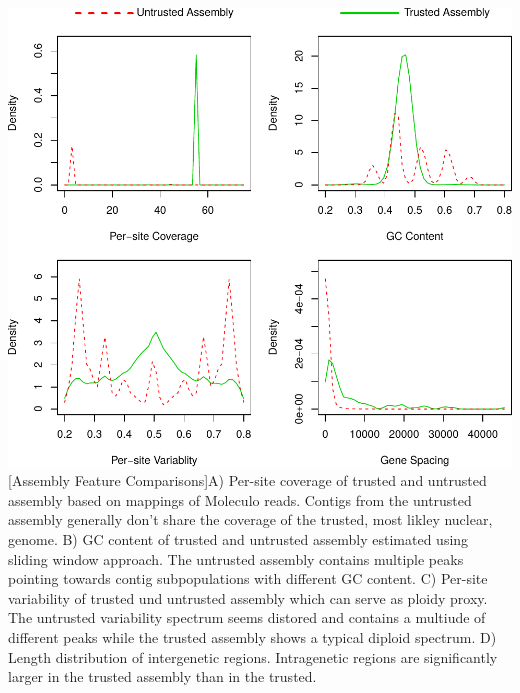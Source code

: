 \documentclass[12pt,a4paper]{scrartcl}
\begin{document}
\includegraphics[width=1\textwidth]{supplementary_figure_2}
[Assembly Feature Comparisons]{A) Per-site coverage
  of trusted and untrusted assembly based on mappings of Moleculo
  reads. Contigs from the untrusted assembly generally don't share the
  coverage of the trusted, most likley nuclear, genome. B) GC content
  of trusted and untrusted assembly estimated using sliding window
  approach. The untrusted assembly contains multiple peaks pointing
  towards contig subpopulations with different GC content. C) Per-site
  variability of trusted und untrusted assembly which can serve as
  ploidy proxy. The untrusted variability spectrum seems distored and
  contains a multiude of different peaks while the trusted assembly
  shows a typical diploid spectrum. D) Length distribution of
  intergenetic regions. Intragenetic regions are significantly larger
  in the trusted assembly than in the trusted.}

\pagebreak
\end{document}
